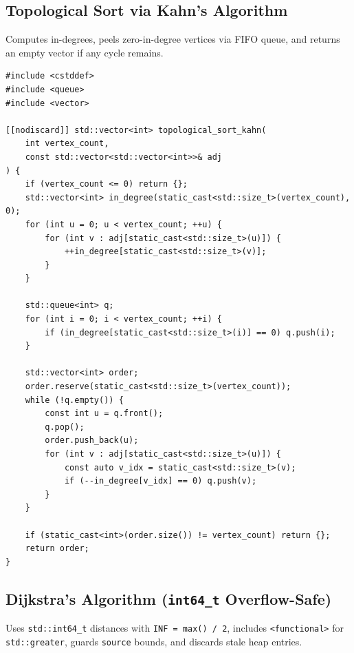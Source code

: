 \documentclass[11pt,a4paper]{article}
\theoremstyle{definition}
\begin{document}
\subsection{Topological Sort via Kahn's Algorithm}
Computes in-degrees, peels zero-in-degree vertices via FIFO queue, and returns an empty vector if any cycle remains.

\begin{lstlisting}[caption={Topological sort and cycle detection via Kahn's algorithm}]
#include <cstddef>
#include <queue>
#include <vector>

[[nodiscard]] std::vector<int> topological_sort_kahn(
    int vertex_count,
    const std::vector<std::vector<int>>& adj
) {
    if (vertex_count <= 0) return {};
    std::vector<int> in_degree(static_cast<std::size_t>(vertex_count), 0);
    for (int u = 0; u < vertex_count; ++u) {
        for (int v : adj[static_cast<std::size_t>(u)]) {
            ++in_degree[static_cast<std::size_t>(v)];
        }
    }

    std::queue<int> q;
    for (int i = 0; i < vertex_count; ++i) {
        if (in_degree[static_cast<std::size_t>(i)] == 0) q.push(i);
    }

    std::vector<int> order;
    order.reserve(static_cast<std::size_t>(vertex_count));
    while (!q.empty()) {
        const int u = q.front();
        q.pop();
        order.push_back(u);
        for (int v : adj[static_cast<std::size_t>(u)]) {
            const auto v_idx = static_cast<std::size_t>(v);
            if (--in_degree[v_idx] == 0) q.push(v);
        }
    }

    if (static_cast<int>(order.size()) != vertex_count) return {};
    return order;
}
\end{lstlisting}

\subsection{Dijkstra's Algorithm (\texorpdfstring{\texttt{int64\_t}}{int64\_t} Overflow-Safe)}
Uses \texttt{std::int64\_t} distances with \texttt{INF = max() / 2}, includes \texttt{<functional>} for \texttt{std::greater}, guards \texttt{source} bounds, and discards stale heap entries.
\end{document}
